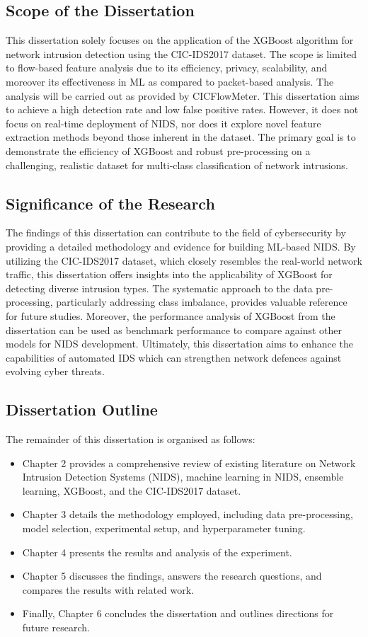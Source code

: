 \subsection{Scope of the Dissertation}
This dissertation solely focuses on the application of the XGBoost algorithm for network intrusion detection using the CIC-IDS2017 dataset. The scope is limited to flow-based feature analysis due to its efficiency, privacy, scalability, and moreover its effectiveness in ML as compared to packet-based analysis. The analysis will be carried out as provided by CICFlowMeter. This dissertation aims to achieve a high detection rate and low false positive rates. However, it does not focus on real-time deployment of NIDS, nor does it explore  novel feature extraction methods beyond those inherent in the dataset. The primary goal is to demonstrate the efficiency of XGBoost and robust pre-processing on a challenging, realistic dataset for multi-class classification of network intrusions.

\subsection{Significance of the Research}
The findings of this dissertation can contribute to the field of cybersecurity by providing a detailed methodology and evidence for building ML-based NIDS. By utilizing  the CIC-IDS2017 dataset, which closely resembles the real-world network traffic, this dissertation offers insights into the applicability of XGBoost for detecting diverse intrusion types. The systematic approach to the data pre-processing, particularly addressing class imbalance, provides valuable reference for future studies. Moreover, the performance analysis of XGBoost from the dissertation can be used as benchmark performance to compare against other models for NIDS development. Ultimately, this dissertation aims to enhance the capabilities of automated IDS which can strengthen network defences against evolving cyber threats. 

\subsection{Dissertation Outline}
The remainder of this dissertation is organised as follows:
\begin{itemize}
    \item Chapter 2 provides a comprehensive review of existing literature on Network Intrusion Detection Systems (NIDS), machine learning in NIDS, ensemble learning, XGBoost, and the CIC-IDS2017 dataset. 
    \item Chapter 3 details the methodology employed, including data pre-processing, model selection, experimental setup, and hyperparameter tuning. 
    \item Chapter 4 presents the results and analysis of the experiment. 
    \item Chapter 5 discusses the findings, answers the research questions, and compares the results with related work. 
    \item Finally, Chapter 6 concludes the dissertation and outlines directions for future research.
\end{itemize}
    

